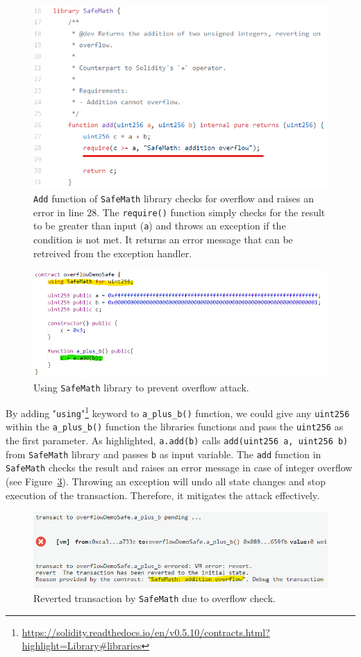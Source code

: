 \begin{figure}[t]
	\centering
	\includegraphics[width=0.7\linewidth]{figures/img12.png}
	\caption{\texttt{Add} function of \texttt{SafeMath} library checks for overflow and raises an error in line 28. The \texttt{require()} function simply checks for the result to be greater than input (\texttt{a}) and throws an exception if the condition is not met. It returns an error message that can be retreived from the exception handler.}
	\label{fig:addsafe}
\end{figure}

\begin{figure}[t]
	\centering
	\includegraphics[width=0.75\linewidth]{figures/img10.png}
	\caption{Using \texttt{SafeMath} library to prevent overflow attack.}
	\label{fig:ovfaddsafe}
\end{figure}
By adding "\texttt{using}"\footnote{\url{https://solidity.readthedocs.io/en/v0.5.10/contracts.html?highlight=Library\#libraries}} keyword to \texttt{a\_plus\_b()} function, we could give any \texttt{uint256} within the \texttt{a\_plus\_b()} function the libraries functions and pass the \texttt{uint256} as the first parameter. As highlighted, \texttt{a.add(b)} calls \texttt{add(uint256 a, uint256 b)} from \texttt{SafeMath} library and passes \texttt{b} as input variable. The \texttt{add} function in \texttt{SafeMath} checks the result and raises an error message in case of integer overflow (see Figure~\ref{fig:ovfaddexcep}). Throwing an exception will undo all state changes and stop execution of the transaction. Therefore, it mitigates the attack effectively.

\begin{figure}[t]
	\centering
	\includegraphics[width=0.7\linewidth]{figures/img11.png}
	\caption{Reverted transaction by \texttt{SafeMath} due to overflow check.}
	\label{fig:ovfaddexcep}
\end{figure}


